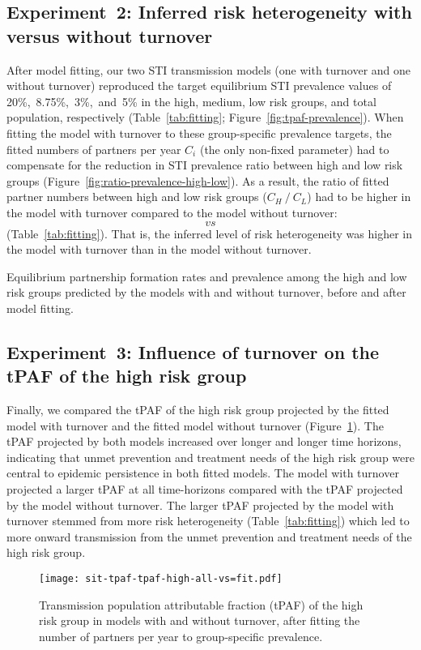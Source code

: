 \subsection{Experiment~2: Inferred risk heterogeneity with versus without turnover}
\label{ss:res-infer}
After model fitting,
our two STI transmission models
(one with turnover and one without turnover)
reproduced the target equilibrium STI prevalence values of 20\%,~8.75\%,~3\%,~and~5\%
in the high, medium, low risk groups, and total population, respectively
(Table~\ref{tab:fitting}; Figure~\ref{fig:tpaf-prevalence}).
When fitting the model with turnover to these group-specific prevalence targets,
the fitted numbers of partners per year $C_i$ (the only non-fixed parameter)
had to compensate for the reduction in
STI prevalence ratio between high and low risk groups
(Figure~\ref{fig:ratio-prevalence-high-low}).
As a result, the ratio of fitted partner numbers
between high and low risk groups ($C_H~/~C_L$)
had to be higher in the model with turnover compared to the model without turnover:
$$~vs~%
$$
(Table~\ref{tab:fitting}).
That is, the inferred level of risk heterogeneity was higher
in the model with turnover than in the model without turnover.
\begin{table}
  \caption{Equilibrium partnership formation rates and prevalence
    among the high and low risk groups
    predicted by the models with and without turnover,
    before and after model fitting.}
  \label{tab:fitting}
  
\end{table}
\subsection{Experiment~3: Influence of turnover on the tPAF of the high risk group}
\label{ss:res-tpaf}
Finally, we compared the tPAF of the high risk group
projected by the fitted model with turnover and the fitted model without turnover
(Figure~\ref{fig:tpaf-fit}).
The tPAF projected by both models
increased over longer and longer time horizons,
indicating that unmet prevention and treatment needs of the high risk group
were central to epidemic persistence in both fitted models.
The model with turnover projected a larger tPAF at all
time-horizons compared with the tPAF projected by the model without turnover.
The larger tPAF projected by the model with turnover
stemmed from more risk heterogeneity (Table~\ref{tab:fitting})
which led to more onward transmission from the unmet
prevention and treatment needs of the high risk group.
\begin{figure}[!tbp]
  \centerline{\texttt{[image: sit-tpaf-tpaf-high-all-vs=fit.pdf]}}
  \caption{Transmission population attributable fraction (tPAF)
    of the high risk group in models with and without turnover,
    after fitting the number of partners per year to group-specific prevalence.}
  \label{fig:tpaf-fit}
\end{figure}